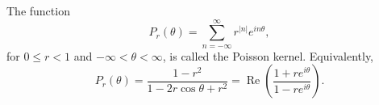 The function
$$P_r(\theta) = \sum_{n=-\infty}^{\infty} r^{|n|} e^{in\theta},$$
for $0 \leq r < 1$ and $-\infty < \theta < \infty$, is called the Poisson kernel. Equivalently,
$$P_r(\theta) = \frac{1 - r^2}{1 - 2r \cos \theta + r^2} = \operatorname{Re}\left(\frac{1 + re^{i\theta}}{1 - re^{i\theta}}\right).$$
